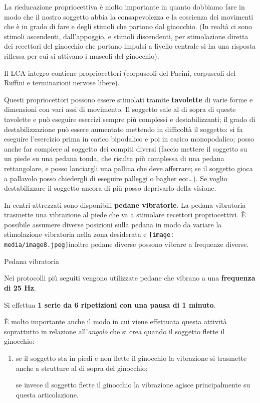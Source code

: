 \documentclass[]{article}
\begin{document}
La rieducazione propriocettiva è molto importante in quanto dobbiamo
fare in modo che il nostro soggetto abbia la consapevolezza e la
coscienza dei movimenti che è in grado di fare e degli stimoli che
partono dal ginocchio. (In realtà ci sono stimoli ascendenti,
dall'appoggio, e stimoli discendenti, per stimolazione diretta dei
recettori del ginocchio che portano impulsi a livello centrale si ha una
risposta riflessa per cui si attivano i muscoli del ginocchio).

Il LCA integro contiene propriocettori (corpuscoli del Pacini,
corpuscoli del Ruffini e terminazioni nervose libere).

Questi propriocettori possono essere stimolati tramite
\textbf{tavolette} di varie forme e dimensioni con vari assi di
movimento. Il soggetto sale al di sopra di queste tavolette e può
eseguire esercizi sempre più complessi e destabilizzanti; il grado di
destabilizzazione può essere aumentato mettendo in difficoltà il
soggetto: si fa eseguire l'esercizio prima in carico bipodalico e poi in
carico monopodalico; posso anche far compiere al soggetto dei compiti
diversi (faccio mettere il soggetto su un piede su una pedana tonda, che
risulta più complessa di una pedana rettangolare, e posso lanciargli una
pallina che deve afferrare; se il soggetto gioca a pallavolo posso
chiedergli di eseguire palleggi o bagher ecc\ldots{}). Se voglio
destabilizzare il soggetto ancora di più posso deprivarlo della visione.

In centri attrezzati sono disponibili \textbf{pedane vibratorie}. La
pedana vibratoria trasmette una vibrazione al piede che va a stimolare
recettori propriocettivi. È possibile assumere diverse posizioni sulla
pedana in modo da variare la stimolazione vibratoria nella zona
desiderata e
\texttt{[image: media/image8.jpeg]}inoltre
pedane diverse possono vibrare a frequenze diverse.

Pedana vibratoria

Nei protocolli più seguiti vengono utilizzate pedane che vibrano a una
\textbf{frequenza di 25 Hz}.

Si effettua \textbf{1 serie da 6 ripetizioni con una pausa di 1 minuto}.

È molto importante anche il modo in cui viene effettuata questa attività
soprattutto in relazione all'\emph{angolo} che si crea quando il
soggetto flette il ginocchio:

\begin{enumerate}
\def\labelenumi{\arabic{enumi}.}
\item
  se il soggetto sta in piedi e non flette il ginocchio la vibrazione si
  trasmette anche a strutture al di sopra del ginocchio;

  se invece il soggetto flette il ginocchio la vibrazione agisce
  principalmente su questa articolazione.
\end{enumerate}
\end{document}
